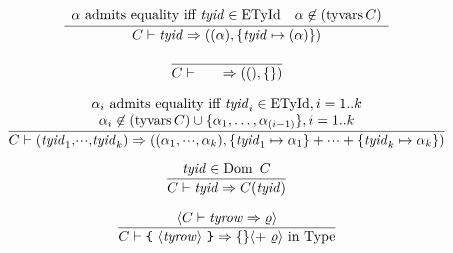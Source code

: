 \begin{equation}	%
\label{tyidtyidseq-rule}
\frac{\begin{array}{lr}
       \mbox{$\alpha$ admits equality iff $\tyid \in \ETyId$} &
        \alpha \not\in(\TyVarsFcn\C) 
      \end{array}}
     {\C\ts\tyid\ra((\alpha),\{\tyid\mapsto(\alpha)\})}
\end{equation}

\begin{equation}	%
\label{emptytyidseq-rule}
\frac{ }
     {\C\ts\qquad\ra((),\emptymap)}
\end{equation}

\begin{equation}	%
\label{tyidktyidseq-rule}
\frac{\begin{array}{c}
      \mbox{$\alpha_i$ admits equality iff $\tyid_i \in \ETyId, i = 1..k$} \\
      \alpha_i \not\in(\TyVarsFcn\C) \cup \{\alpha_1, \ldots, \alpha_{(i-1)}\},
             i = 1..k
      \end{array}
     }
     {\C\ts\ml{(}\tyid_1\ml{,}\cdots\ml{,}\tyid_k\ml{)}\ra((\alpha_1,\cdots, \alpha_k),                                 \{\tyid_1\mapsto\alpha_1\} +
                                   \cdots +
                                   \{\tyid_k\mapsto\alpha_k\})}
\end{equation}




\begin{equation}	%
\frac{\tyid\in\Dom\ \C}
     {\C\ts\tyid\ra\C(\tyid)}\index{32.1}
\end{equation}

\begin{equation}	%
\frac{\langle\C\ts\labtys\ra\varrho\rangle}
     {\C\ts\lttbrace\ \rectype\ \rttbrace\ra\emptymap\langle +\ \varrho\rangle\ \In\ \Type}
\end{equation}

